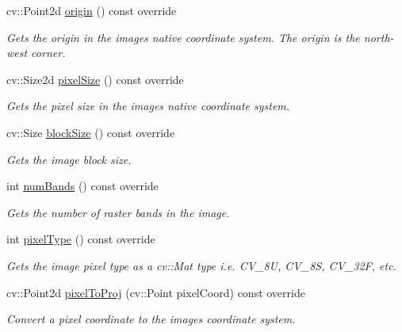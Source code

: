 \begin{DoxyCompactItemize}
cv\+::\+Point2d \hyperlink{classdg_1_1deepcore_1_1imagery_1_1_map_service_image_a60100be52a03f32adb25eb8237cd3836}{origin} () const override
\begin{DoxyCompactList}\small\item\em Gets the origin in the image\textquotesingle{}s native coordinate system. The origin is the north-\/west corner. \end{DoxyCompactList}\item 
cv\+::\+Size2d \hyperlink{classdg_1_1deepcore_1_1imagery_1_1_map_service_image_a0bb95ccc2ad0160d8e2e1a248c26a51e}{pixel\+Size} () const override
\begin{DoxyCompactList}\small\item\em Gets the pixel size in the image\textquotesingle{}s native coordinate system. \end{DoxyCompactList}\item 
cv\+::\+Size \hyperlink{classdg_1_1deepcore_1_1imagery_1_1_map_service_image_afef951f5317ff1c8781dbd1f7c9876a1}{block\+Size} () const override
\begin{DoxyCompactList}\small\item\em Gets the image block size. \end{DoxyCompactList}\item 
int \hyperlink{classdg_1_1deepcore_1_1imagery_1_1_map_service_image_a1ff44d3ae2adde1c3d0a0304c4139052}{num\+Bands} () const override
\begin{DoxyCompactList}\small\item\em Gets the number of raster bands in the image. \end{DoxyCompactList}\item 
int \hyperlink{classdg_1_1deepcore_1_1imagery_1_1_map_service_image_a248e1db1221651de23b1ef2c155f4124}{pixel\+Type} () const override
\begin{DoxyCompactList}\small\item\em Gets the image pixel type as a cv\+::\+Mat type i.\+e. C\+V\+\_\+8U, C\+V\+\_\+8S, C\+V\+\_\+32F, etc. \end{DoxyCompactList}\item 
cv\+::\+Point2d \hyperlink{classdg_1_1deepcore_1_1imagery_1_1_map_service_image_abcdf7a48a9594c8653ef6d36941ae23a}{pixel\+To\+Proj} (cv\+::\+Point pixel\+Coord) const override
\begin{DoxyCompactList}\small\item\em Convert a pixel coordinate to the image\textquotesingle{}s coordinate system. \end{DoxyCompactList}\item 

\end{DoxyCompactItemize}
